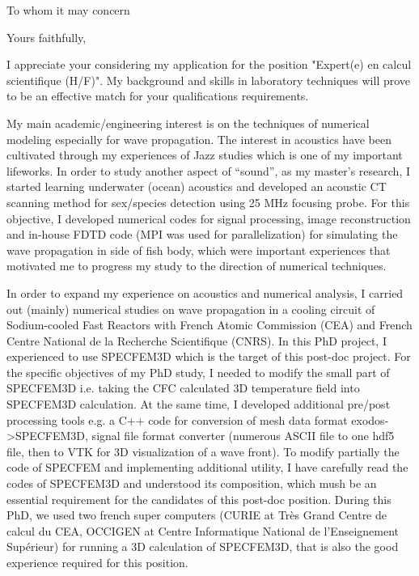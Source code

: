 \documentclass[9pt,a4paper]{moderncv}
\begin{document}
  
    \clearpage
    \date{April 08, 2019}
    \opening{To whom it may concern}
    \closing{Yours faithfully,}
    
    \makelettertitle

  
    I appreciate your considering my application for the position "Expert(e) en calcul scientifique (H/F)". My background and skills in laboratory techniques will prove to be an effective match for your qualifications requirements.
    
    My main academic/engineering interest is on the techniques of numerical modeling especially for wave propagation. The interest in acoustics have been cultivated through my experiences of Jazz studies which is one of my important lifeworks.
    In order to study another aspect of “sound”,  as my master’s research, I started learning underwater (ocean) acoustics and developed an acoustic CT scanning method for sex/species detection using 25 MHz focusing probe. For this objective, I developed numerical codes for signal processing, image reconstruction and in-house FDTD code (MPI was used for parallelization) for simulating the wave propagation in side of fish body, which were important experiences that motivated me to progress my study to the direction of numerical techniques.
    
    In order to expand my experience on acoustics and numerical analysis, I carried out (mainly) numerical studies on wave propagation in a cooling circuit of Sodium-cooled Fast Reactors with French Atomic Commission (CEA) and French Centre National de la Recherche Scientifique (CNRS).
    In this PhD project, I experienced to use SPECFEM3D which is the target of this post-doc project. For the specific objectives of my PhD study, I needed to modify the small part of SPECFEM3D i.e. taking the CFC calculated 3D temperature field into SPECFEM3D calculation. 
    At the same time, I developed additional pre/post processing tools e.g. a C++ code for conversion of mesh data format exodos->SPECFEM3D, signal file format converter (numerous ASCII file to one hdf5 file, then to VTK for 3D visualization of a wave front).
    To modify partially the code of SPECFEM and implementing additional utility, I have carefully read the codes of SPECFEM3D and understood its composition, which mush be an essential requirement for the candidates of this post-doc position.
    During this PhD, we used two french super computers (CURIE at Très Grand Centre de calcul du CEA, OCCIGEN at Centre Informatique National de l’Enseignement Supérieur) for running a 3D calculation of SPECFEM3D, that is also the good experience required for this position.
    
\end{document}
